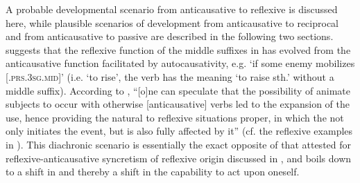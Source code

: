 A probable developmental scenario from anticausative to reflexive is discussed here, while plausible scenarios of development from anticausative to reciprocal and from anticausative to passive are described in the following two sections. \cite[235]{inglese:2020} suggests that the reflexive function of the middle suffixes in  has evolved from the anticausative function facilitated by autocausativity, e.g. ‘if some enemy mobilizes [.\textsc{prs.3sg.mid}]’ (i.e. ‘to rise’, the verb  has the meaning ‘to raise sth.’ without a middle suffix). According to \cite[236]{inglese:2020}, “[o]ne can speculate that the possibility of animate subjects to occur with otherwise [anticausative] verbs led to the expansion of the  use, hence providing the natural  to reflexive situations proper, in which the  not only initiates the event, but is also fully affected by it” (cf. the reflexive examples in ). This diachronic scenario is essentially the exact opposite of that attested for reflexive-anticausative syncretism of reflexive origin discussed in , and boils down to a shift in  and thereby a shift in the capability to act upon oneself.


